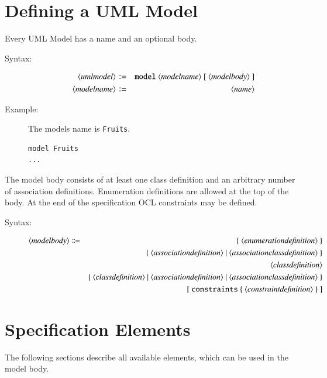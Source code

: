 \documentclass[a4paper,titlepage,oneside,final]{scrreprt} %
\begin{document}
\section{Defining a UML Model}
Every UML Model  has a name and an optional body.
\begin{description}
\item[Syntax:]
\begin{eqnarray*}
\langle\mathit{umlmodel\rangle}&\Coloneqq& \verb+model+ ~
\langle\mathit{modelname}\rangle~ [~\langle\mathit{modelbody}\rangle~]\\
\langle\mathit{modelname}\rangle &\Coloneqq& \langle\mathit{name}\rangle
\end{eqnarray*}
\item[Example:] The models name is \verb+Fruits+.
\begin{verbatim}
model Fruits
...
\end{verbatim}
\end{description}
The model body consists of at least one class definition
and an arbitrary number of association definitions.
Enumeration definitions are allowed at the top of the body.
At the end of the specification OCL constraints may be defined.
\begin{description}
\item[Syntax:]
\begin{eqnarray*}
\langle\mathit{modelbody}\rangle &\Coloneqq&
\{~\langle\mathit{enumerationdefinition}\rangle~\}\\
&&\{~\langle\mathit{associationdefinition}\rangle~|~
\langle\mathit{associationclassdefinition}\rangle~\}\\
&&\langle\mathit{classdefinition}\rangle\\
&&\{~\langle\mathit{classdefinition}\rangle ~|~
\langle\mathit{associationdefinition}\rangle~
|~\langle\mathit{associationclassdefinition}\rangle~\}\\
&&[~\verb+constraints+ ~\{~\langle\mathit{constraintdefinition}\rangle~\}~]
\end{eqnarray*}
\end{description}
\section{Specification Elements}
The following sections describe all available elements, which can be used
in the model body.
\end{document}
